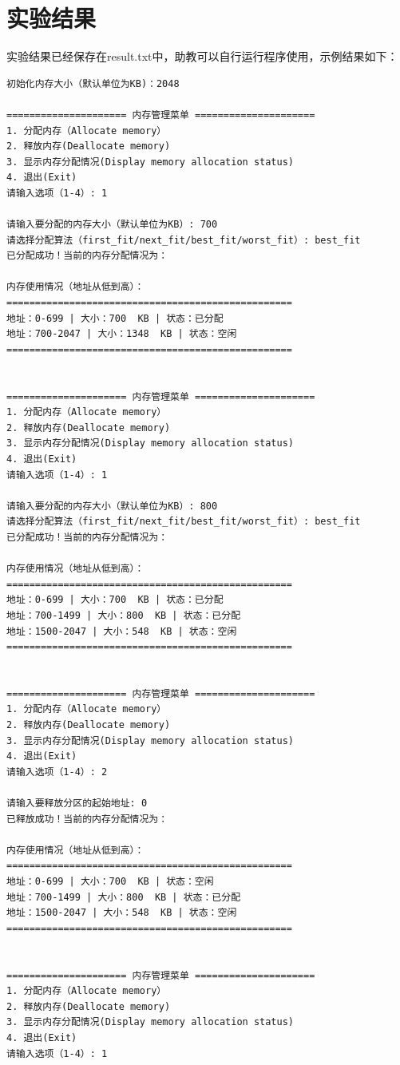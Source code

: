 \documentclass[UTF8]{ctexart}
\begin{document}
\section{实验结果}
实验结果已经保存在result.txt中，助教可以自行运行程序使用，示例结果如下：
\begin{lstlisting}[frame=shadowbox]
初始化内存大小（默认单位为KB)：2048

===================== 内存管理菜单 =====================
1. 分配内存（Allocate memory）
2. 释放内存(Deallocate memory)
3. 显示内存分配情况(Display memory allocation status)
4. 退出(Exit)
请输入选项（1-4）: 1

请输入要分配的内存大小（默认单位为KB）: 700
请选择分配算法（first_fit/next_fit/best_fit/worst_fit）: best_fit
已分配成功！当前的内存分配情况为：

内存使用情况（地址从低到高）：
==================================================
地址：0-699 | 大小：700  KB | 状态：已分配
地址：700-2047 | 大小：1348  KB | 状态：空闲
==================================================


===================== 内存管理菜单 =====================
1. 分配内存（Allocate memory）
2. 释放内存(Deallocate memory)
3. 显示内存分配情况(Display memory allocation status)
4. 退出(Exit)
请输入选项（1-4）: 1

请输入要分配的内存大小（默认单位为KB）: 800
请选择分配算法（first_fit/next_fit/best_fit/worst_fit）: best_fit
已分配成功！当前的内存分配情况为：

内存使用情况（地址从低到高）：
==================================================
地址：0-699 | 大小：700  KB | 状态：已分配
地址：700-1499 | 大小：800  KB | 状态：已分配
地址：1500-2047 | 大小：548  KB | 状态：空闲
==================================================


===================== 内存管理菜单 =====================
1. 分配内存（Allocate memory）
2. 释放内存(Deallocate memory)
3. 显示内存分配情况(Display memory allocation status)
4. 退出(Exit)
请输入选项（1-4）: 2

请输入要释放分区的起始地址: 0
已释放成功！当前的内存分配情况为：

内存使用情况（地址从低到高）：
==================================================
地址：0-699 | 大小：700  KB | 状态：空闲
地址：700-1499 | 大小：800  KB | 状态：已分配
地址：1500-2047 | 大小：548  KB | 状态：空闲
==================================================


===================== 内存管理菜单 =====================
1. 分配内存（Allocate memory）
2. 释放内存(Deallocate memory)
3. 显示内存分配情况(Display memory allocation status)
4. 退出(Exit)
请输入选项（1-4）: 1


\end{lstlisting}
\end{document}
